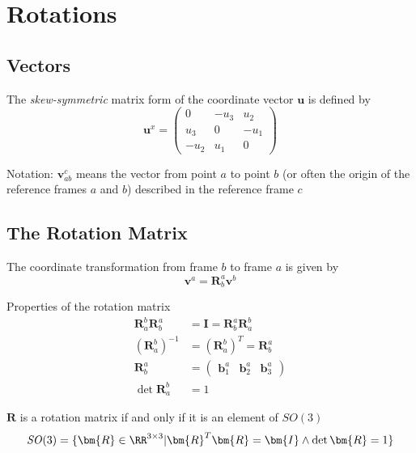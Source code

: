 \section{Rotations}

\setcounter{section}{6}
\setcounter{subsection}{1}
\subsection{Vectors} %

The \textit{skew-symmetric} matrix form of the coordinate vector $\mathbf{u}$ is defined by
\[\mathbf{u}^x=\begin{pmatrix}
    0    & -u_3 & u_2 \\
    u_3  & 0    & -u_1 \\
    -u_2 & u_1  & 0 
\end{pmatrix}\]

Notation: \(\bm{v}_{ab}^c\) means the vector from point \(a\) to point \(b\) (or often the origin of the reference frames \(a\) and \(b\)) described in the reference frame \(c\)
\newline

\setcounter{subsection}{3}
\subsection{The Rotation Matrix} %

The coordinate transformation from frame \(\mathit{b}\) to frame \(\mathit{a}\) is given by
\[
\bm{v}^a = \bm{R}_b^a\bm{v}^b
\]

Properties of the rotation matrix
\begin{align*}
    \bm{R}_a^b \bm{R}_b^a &= \bm{I}=  \bm{R}_b^a \bm{R}_a^b\\
    (\bm{R}_a^b)^{-1} &= (\bm{R}_a^b)^{T} = \bm{R}_b^a \\
    \bm{R}_b^a &= \begin{pmatrix}\bm{b}_1^a& \bm{b}_2^a& \bm{b}_3^a\end{pmatrix} \\
    \det{\bm{R}_a^b} &= 1
\end{align*}

\(\bm{R}\) is a rotation matrix if and only if it is an element of \(\mathit{SO}(3)\)
\[\mathit{SO}(3) = \{\bm{R} \in \RR^{3\times3} | \bm{R}^T\bm{R} = \bm{I} \wedge \det \bm{R} = 1\}\]


